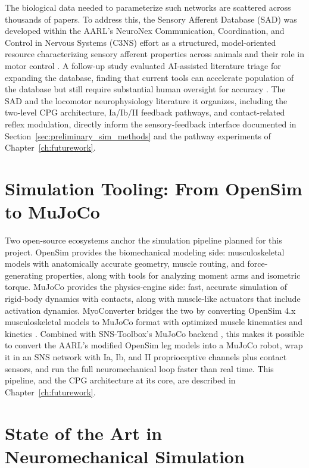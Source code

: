 The biological data needed to parameterize such networks are scattered across thousands of papers. To address this, the Sensory Afferent Database (SAD) was developed within the AARL's NeuroNex Communication, Coordination, and Control in Nervous Systems (C3NS) effort as a structured, model-oriented resource characterizing sensory afferent properties across animals and their role in motor control \citep{bolen_sensory_2023}. A follow-up study evaluated AI-assisted literature triage for expanding the database, finding that current tools can accelerate population of the database but still require substantial human oversight for accuracy \citep{bolen_using_2024}. The SAD and the locomotor neurophysiology literature it organizes, including the two-level CPG architecture, Ia/Ib/II feedback pathways, and contact-related reflex modulation, directly inform the sensory-feedback interface documented in Section~\ref{sec:preliminary_sim_methods} and the pathway experiments of Chapter~\ref{ch:futurework}.

\section{Simulation Tooling: From OpenSim to MuJoCo}\label{sec:bg_tools}

Two open-source ecosystems anchor the simulation pipeline planned for this project. OpenSim \citep{delp_opensim_2007, seth_opensim_2018} provides the biomechanical modeling side: musculoskeletal models with anatomically accurate geometry, muscle routing, and force-generating properties, along with tools for analyzing moment arms and isometric torque. MuJoCo \citep{todorov_mujoco_2012} provides the physics-engine side: fast, accurate simulation of rigid-body dynamics with contacts, along with muscle-like actuators that include activation dynamics. MyoConverter bridges the two by converting OpenSim 4.x musculoskeletal models to MuJoCo format with optimized muscle kinematics and kinetics \citep{caggiano_myosuite_2022, wang_myosim_2022}. Combined with SNS-Toolbox's MuJoCo backend \citep{nourse_sns_2023}, this makes it possible to convert the AARL's modified OpenSim leg models into a MuJoCo robot, wrap it in an SNS network with Ia, Ib, and II proprioceptive channels plus contact sensors, and run the full neuromechanical loop faster than real time. This pipeline, and the CPG architecture at its core, are described in Chapter~\ref{ch:futurework}.

\section{State of the Art in Neuromechanical Simulation}\label{sec:bg_sota}

